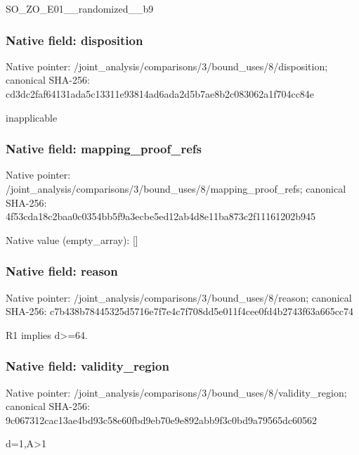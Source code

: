 \documentclass[10pt,a4paper]{article}
\begin{document}
\begingroup\raggedright\sloppy SO\_\allowbreak{}ZO\_\allowbreak{}E01\_\allowbreak{}\_\allowbreak{}randomized\_\allowbreak{}\_\allowbreak{}b9\par\endgroup

\subsubsection{Native field: disposition}
Native pointer: /joint\_\allowbreak{}analysis/comparisons/3/bound\_\allowbreak{}uses/8/disposition; canonical SHA-256: cd3dc2faf64131ada5c13311e93814ad6ada2d5b7ae8b2c083062a1f704cc84e

\begingroup\raggedright\sloppy inapplicable\par\endgroup

\subsubsection{Native field: mapping\_\allowbreak{}proof\_\allowbreak{}refs}
Native pointer: /joint\_\allowbreak{}analysis/comparisons/3/bound\_\allowbreak{}uses/8/mapping\_\allowbreak{}proof\_\allowbreak{}refs; canonical SHA-256: 4f53cda18c2baa0c0354bb5f9a3ecbe5ed12ab4d8e11ba873c2f11161202b945

Native value (empty\_\allowbreak{}array): []

\subsubsection{Native field: reason}
Native pointer: /joint\_\allowbreak{}analysis/comparisons/3/bound\_\allowbreak{}uses/8/reason; canonical SHA-256: c7b438b78445325d5716e7f7e4c7f708dd5e011f4cee0fd4b2743f63a665cc74

\begingroup\raggedright\sloppy R1 implies d>=\allowbreak{}64.\par\endgroup

\subsubsection{Native field: validity\_\allowbreak{}region}
Native pointer: /joint\_\allowbreak{}analysis/comparisons/3/bound\_\allowbreak{}uses/8/validity\_\allowbreak{}region; canonical SHA-256: 9c067312cac13ae4bd93c58e60fbd9eb70e9e892abb9f3c0bd9a79565dc60562

\begingroup\raggedright\sloppy d=\allowbreak{}1,\allowbreak{}A>1\par\endgroup
\end{document}
